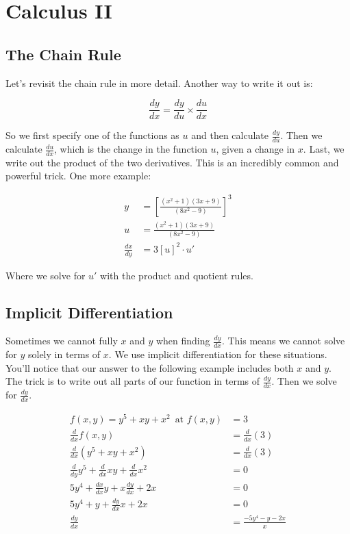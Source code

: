 \section{Calculus II}

\subsection{The Chain Rule}

Let's revisit the chain rule in more detail. Another way to write it out is:

\begin{equation*}
    \frac{dy}{dx} = \frac{dy}{du} \times \frac{du}{dx}
\end{equation*}

\noindent So we first specify one of the functions as $u$ and then calculate $\frac{dy}{du}$. Then we calculate $\frac{du}{dx}$, which is the change in the function $u$, given a change in $x$. Last, we write out the product of the two derivatives. This is an incredibly common and powerful trick. One more example:

\begin{align*}
    y & = \left[\frac{(x^2 + 1)(3x+9)}{(8x^2 - 9)}\right]^3 \\
    u & = \frac{(x^2 + 1)(3x+9)}{(8x^2 - 9)} \\
    \frac{dx}{dy} & =  3[u]^2 \cdot u'
\end{align*}

\noindent Where we solve for $u'$ with the product and quotient rules.

\subsection{Implicit Differentiation}

Sometimes we cannot fully $x$ and $y$ when finding $\frac{dy}{dx}$. This means we cannot solve for $y$ solely in terms of $x$. We use implicit differentiation for these situations. You'll notice that our answer to the following example includes both $x$ and $y$. The trick is to write out all parts of our function in terms of $\frac{dy}{dx}$. Then we solve for $\frac{dy}{dx}$.

\begin{align*}
    f(x,y) = y^5 + xy + x^2 \, \, \, \text{at } f(x,y) & = 3 \\ 
    \frac{d}{dx} f(x,y) & = \frac{d}{dx}(3) \\
    \frac{d}{dx} (y^5 + xy + x^2) & = \frac{d}{dx} (3) \\
    \frac{d}{dy}y^5 + \frac{d}{dx}xy + \frac{d}{dx}x^2 & = 0 \\
    5y^4 + \frac{dx}{dx}y + x\frac{dy}{dx} + 2x & = 0 \\
    5y^4 + y + \frac{dy}{dx}x + 2x & = 0 \\
    \frac{dy}{dx} & = \frac{-5y^4 - y - 2x}{x}
\end{align*}

